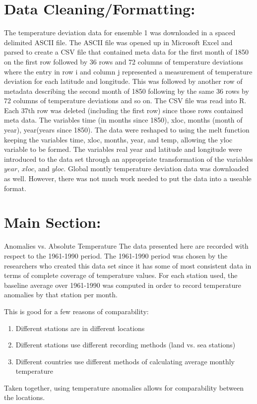 \documentclass{article}\usepackage{graphicx, color}
\begin{document}
\section{Data Cleaning/Formatting:}
The temperature deviation data for ensemble 1 was downloaded in a spaced delimited ASCII file.  The ASCII file was opened up in Microsoft Excel and parsed to create a CSV file that contained meta data for the first month of 1850 on the first row followed by 36 rows and 72 columns of temperature deviations where the entry in row i and column j represented a measurement of temperature deviation for each latitude and longitude. This was followed by another row of metadata describing the second month of 1850 following by the same 36 rows by 72 columns of temperature deviations and so on. The CSV file was read into R. Each 37th row was deleted (including the first row) since those rows contained meta data. The variables time (in months since 1850), xloc, months (month of year), year(years since 1850). The data were reshaped to using the melt function keeping the variables time, xloc, months, year, and temp, allowing the yloc variable to be formed.  The variables real year and latitude and longitude were introduced to the data set through an appropriate transformation of the variables $year$, $xloc$, and $yloc$.
Global montly temperature deviation data was downloaded as well. However, there was not much work needed to put the data into a useable format.

\section{Main Section:}
Anomalies vs. Absolute Temperature
The data presented here are recorded with respect to the 1961-1990 period.  The 1961-1990 period was chosen by the researchers who created this data set since it has some of most consistent data in terms of complete coverage of temperature values. For each station used, the baseline average over 1961-1990 was computed in order to record temperature anomalies by that station per month.

This is good for a few reasons of comparability:
\begin{enumerate}
\item Different stations are in different locations
\item Different stations use different recording methods (land vs. sea stations)
\item Different countries use different methods of calculating average monthly temperature
\end{enumerate}
Taken together, using temperature anomalies allows for comparability between the locations.
\end{document}

